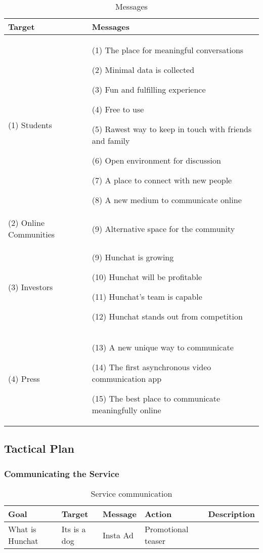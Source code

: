 \documentclass[12pt]{article}
\begin{document}
\begin{table}[htb]
\small
\caption{Messages}
\label{table:msg}
\centering
\begin{tabular}{ @{}P{0.2\textwidth}P{0.7\textwidth}@{} }
Target	&	Messages	\\ \hline
(1) Students \par 	&	(1) The place for meaningful conversations \par (2) Minimal data is collected \par (3) Fun and fulfilling experience \par  (4) Free to use \par (5) Rawest way to keep in touch with friends and family \par (6) Open environment for discussion  \par  (7) A place to connect with new people \par (8) A new medium to communicate online \\
(2) Online Communities & (9) Alternative space for the community \\
(3) Investors	&	(9) Hunchat is growing \par (10) Hunchat will be profitable \par (11) Hunchat's team is capable  \par (12) Hunchat stands out from competition \\
(4) Press	& 	(13) A new unique way to communicate \par (14) The first asynchronous video communication app \par (15) The best place to communicate meaningfully online \\
 \hline
\end{tabular}
\end{table}



\subsection{Tactical Plan}
	\subsubsection{Communicating the Service}
	\begin{table}[htb]
	\small
	\caption{Service communication}
	\label{table:service}
	\centering
	\begin{tabular}{ @{}P{0.18\textwidth}P{0.18\textwidth}P{0.18\textwidth}P{0.18\textwidth}P{0.18\textwidth}@{} }
Goal	&	Target	&	Message	&	Action	&	Description	 \\ \hline
What is Hunchat	&	Its is a dog&	Insta Ad	& 	Promotional teaser
	 \\ \hline
	\end{tabular}
	\end{table}
\end{document}

